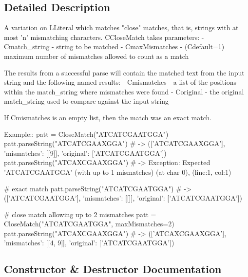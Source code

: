 \subsection{Detailed Description}
\begin{DoxyVerb}A variation on L{Literal} which matches "close" matches, that is, 
strings with at most 'n' mismatching characters. C{CloseMatch} takes parameters:
 - C{match_string} - string to be matched
 - C{maxMismatches} - (C{default=1}) maximum number of mismatches allowed to count as a match

The results from a successful parse will contain the matched text from the input string and the following named results:
 - C{mismatches} - a list of the positions within the match_string where mismatches were found
 - C{original} - the original match_string used to compare against the input string

If C{mismatches} is an empty list, then the match was an exact match.

Example::
    patt = CloseMatch("ATCATCGAATGGA")
    patt.parseString("ATCATCGAAXGGA") # -> (['ATCATCGAAXGGA'], {'mismatches': [[9]], 'original': ['ATCATCGAATGGA']})
    patt.parseString("ATCAXCGAAXGGA") # -> Exception: Expected 'ATCATCGAATGGA' (with up to 1 mismatches) (at char 0), (line:1, col:1)

    # exact match
    patt.parseString("ATCATCGAATGGA") # -> (['ATCATCGAATGGA'], {'mismatches': [[]], 'original': ['ATCATCGAATGGA']})

    # close match allowing up to 2 mismatches
    patt = CloseMatch("ATCATCGAATGGA", maxMismatches=2)
    patt.parseString("ATCAXCGAAXGGA") # -> (['ATCAXCGAAXGGA'], {'mismatches': [[4, 9]], 'original': ['ATCATCGAATGGA']})
\end{DoxyVerb}
 

\subsection{Constructor \& Destructor Documentation}
\mbox{\label{classpkg__resources_1_1__vendor_1_1pyparsing_1_1CloseMatch_ae8e321cbc22d9559d53155a0e533acb2}} 
